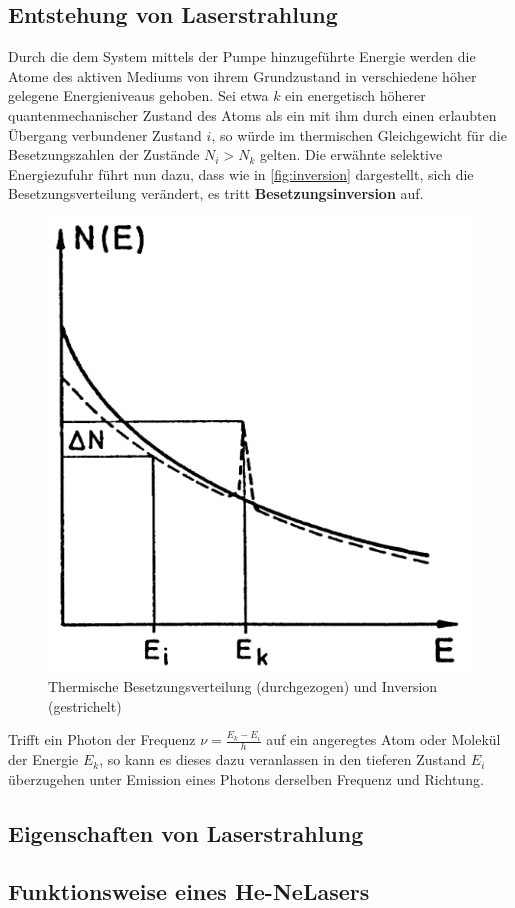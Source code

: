 \subsection{Entstehung von Laserstrahlung}\label{subsec:entstehung}
Durch die dem System mittels der Pumpe hinzugeführte Energie werden die Atome des aktiven Mediums von ihrem Grundzustand in verschiedene höher gelegene Energieniveaus gehoben.
Sei etwa $k$ ein energetisch höherer quantenmechanischer Zustand des Atoms als ein mit ihm durch einen erlaubten Übergang verbundener Zustand $i$, so würde im thermischen Gleichgewicht für die Besetzungszahlen der Zustände $N_i>N_k$ gelten. Die erwähnte selektive Energiezufuhr führt nun dazu, dass wie in \autoref{fig:inversion} dargestellt, sich die Besetzungsverteilung verändert, es tritt \textbf{Besetzungsinversion} auf.
\begin{figure}[H]
    \centering
    \includegraphics[scale=0.5]{Ressourcen/inversion.png}
    \caption{Thermische Besetzungsverteilung (durchgezogen) und Inversion (gestrichelt)\cite{Demtroeder}}\label{fig:inversion}
\end{figure}
Trifft ein Photon der Frequenz $\nu = \frac{E_k-E_i}{h}$ auf ein angeregtes Atom oder Molekül der Energie $E_k$, so kann es dieses dazu veranlassen in den tieferen Zustand $E_i$ überzugehen unter Emission eines Photons derselben Frequenz und Richtung.

\subsection{Eigenschaften von Laserstrahlung}
\subsection{Funktionsweise eines He-NeLasers}